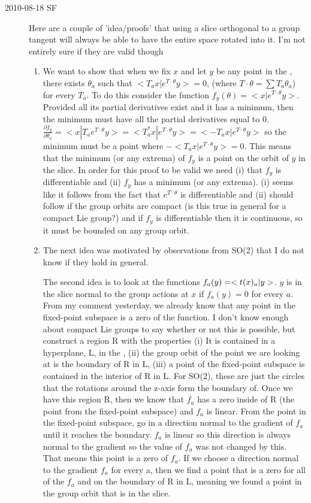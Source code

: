 \begin{description}
\item[2010-08-18 SF]
Here are a couple of 'idea/proofs' that using a slice orthogonal to a group tangent will always be able to have the entire space rotated into it. I'm not entirely sure if they are valid though
\begin{enumerate}
    \item
We want to show that when we fix $x$ and let $y$ be any point in the {\statesp}, there exists $\theta_a$ such that $<T_a x|e^{T\cdot \theta}y>=0$, (where $T \cdot \theta=\sum T_a \theta_a$) for every $T_a$.
To do this consider the function $f_y(\theta)=<x|e^{T \cdot \theta} y>$. Provided all its partial derivatives exist and it has a minimum, then the minimum must have all the partial derivatives equal to 0. $\frac{\partial f_y}{\partial \theta_a}=<x|T_a e^{T \cdot \theta} y>=<T_a^* x|e^{T \cdot \theta} y>=<-T_a x|e^{T \cdot \theta} y>$ so the minimum must be a point where $-<T_a x|e^{T \cdot \theta} y>=0$. This means that the minimum (or any extrema) of $f_y$ is a point on the orbit of $y$ in the slice.
In order for this proof to be valid we need (i) that $f_y$ is differentiable and (ii) $f_y$ has a minimum (or any extrema). (i) seems like it follows from the fact that $e^{T \cdot \theta}$ is differentiable and (ii) should follow if the group orbits are compact (is this true in general for a compact Lie group?) and if $f_y$ is differentiable then it is continuous, so it must be bounded on any group orbit.
    \item
The next idea was motivated by observations from SO(2) that I do not know if they hold in general.

The second idea is to look at the functions $f_a(y)=<t(x)_a| y>$. $ y$ is in the slice normal to the group actions at $x$ if $f_a(y)=0$ for every $a$. From my comment yesterday, we already know that any point in the fixed-point subspace is a zero of the function. I don't know enough about compact Lie groups to say whether or not this is possible, but construct a region R with the properties (i) It is contained in a hyperplane, L, in the {\statesp}, (ii) the group orbit of the point we are looking at is the boundary of R in L, (iii) a point of the fixed-point subspace is contained in the interior of R in L. For SO(2), these are just the circles that the rotations around the z-axis form the boundary of. Once we have this region R, then we know that $f_a$ has a zero inside of R (the point from the fixed-point subspace) and $f_a$ is linear. From the point in the fixed-point subspace, go in a direction normal to the gradient of $f_a$ until it reaches the boundary. $f_a$ is linear so this direction is always normal to the gradient so the value of $f_a$ was not changed by this. That means this point is a zero of $f_a$. If we choose a direction normal to the gradient $f_a$ for every a, then we find a point that is a zero for all of the $f_a$ and on the boundary of R in L, meaning we found a point in the group orbit that is in the slice.
\end{enumerate}


\end{description}
